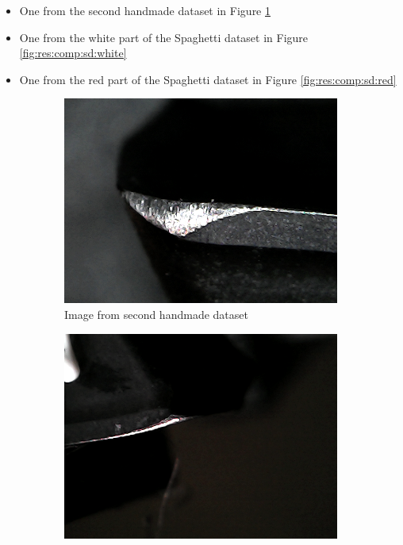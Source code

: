 \begin{itemize}
\item One from the second handmade dataset in Figure \ref{fig:res:comp:shd}
\item One from the white part of the Spaghetti dataset in Figure \ref{fig:res:comp:sd:white}
\item One from the red part of the Spaghetti dataset in Figure \ref{fig:res:comp:sd:red}
\end{itemize} 

	\begin{figure}[hbtp]
		\centering
		\begin{subfigure}{0.31\textwidth}
			\includegraphics[width=\linewidth]{fig/Vision/Dataset/handmade_datasets/Second_handmade_dataset/b_005_p_010_s.jpg}
			\caption{Image from second handmade dataset}
			\label{fig:res:comp:shd}
		\end{subfigure}
		\hspace*{\fill}
		\begin{subfigure}{0.31\textwidth}
			\centering
			\includegraphics[width=\linewidth]{fig/Vision/Dataset/automated_datasets/2_created_datasets/2_Spaghetti_dataset/b_003_p_006_l_006-011_white_nb.png}

\end{subfigure}
\end{figure}
